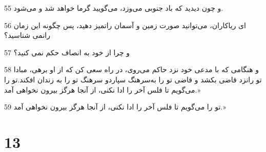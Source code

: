 \par 55 و چون دیدید که باد جنوبی می‌وزد، می‌گویید گرما خواهد شد و می‌شود.
\par 56 ‌ای ریاکاران، می‌توانید صورت زمین و آسمان راتمیز دهید، پس چگونه این زمان رانمی شناسید؟
\par 57 و چرا از خود به انصاف حکم نمی کنید؟
\par 58 و هنگامی که با مدعی خود نزد حاکم می‌روی، در راه سعی کن که از او برهی، مبادا تو رانزد قاضی بکشد و قاضی تو را به‌سرهنگ سپاردو سرهنگ تو را به زندان افکند.تو را می‌گویم تا فلس آخر را ادا نکنی، از آنجا هرگز بیرون نخواهی آمد.»
\par 59 تو را می‌گویم تا فلس آخر را ادا نکنی، از آنجا هرگز بیرون نخواهی آمد.»

\chapter{13}

